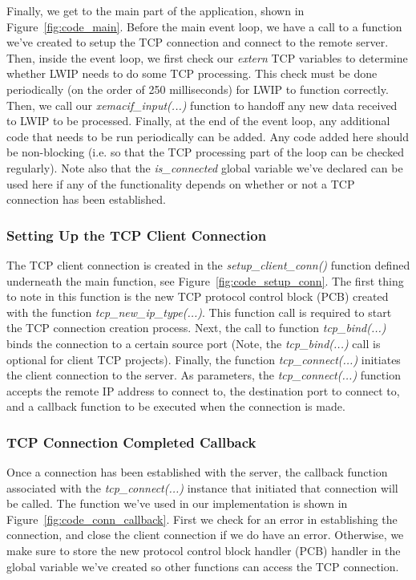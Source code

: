 \documentclass[11pt]{article}
\begin{document}
Finally, we get to the main part of the application, shown in Figure~\ref{fig:code_main}. Before the main event loop, we have a call to a function we've created to setup the TCP connection and connect to the remote server. Then, inside the event loop, we first check our \textit{extern} TCP variables to determine whether LWIP needs to do some TCP processing. This check must be done periodically (on the order of 250 milliseconds) for LWIP to function correctly. Then, we call our \textit{xemacif\_input(...)} function to handoff any new data received to LWIP to be processed. Finally, at the end of the event loop, any additional code that needs to be run periodically can be added. Any code added here should be non-blocking (i.e. so that the TCP processing part of the loop can be checked regularly). Note also that the \textit{is\_connected} global variable we've declared can be used here if any of the functionality depends on whether or not a TCP connection has been established.

\subsubsection*{Setting Up the TCP Client Connection}
The TCP client connection is created in the \textit{setup\_client\_conn()} function defined underneath the main function, see Figure~\ref{fig:code_setup_conn}. The first thing to note in this function is the new TCP protocol control block (PCB) created with the function \textit{tcp\_new\_ip\_type(...)}. This function call is required to start the TCP connection creation process. Next, the call to function \textit{tcp\_bind(...)} binds the connection to a certain source port (Note, the \textit{tcp\_bind(...)} call is optional for client TCP projects). Finally, the function \textit{tcp\_connect(...)} initiates the client connection to the server. As parameters, the \textit{tcp\_connect(...)} function accepts the remote IP address to connect to, the destination port to connect to, and a callback function to be executed when the connection is made.

\subsubsection*{TCP Connection Completed Callback}
Once a connection has been established with the server, the callback function associated with the \textit{tcp\_connect(...)} instance that initiated that connection will be called. The function we've used in our implementation is shown in Figure~\ref{fig:code_conn_callback}. First we check for an error in establishing the connection, and close the client connection if we do have an error. Otherwise, we make sure to store the new protocol control block handler (PCB) handler in the global variable we've created so other functions can access the TCP connection.
\end{document}
